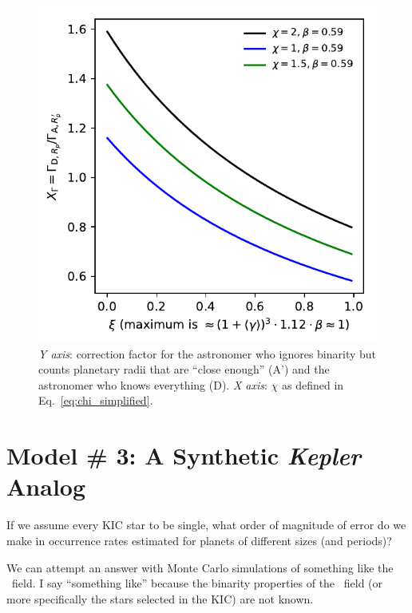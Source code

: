 \documentclass{emulateapj}
\begin{document}
\begin{figure}[!t]
	\begin{center}
		\includegraphics[scale=.8]{figures/XGamma_vs_xi.pdf}
	\end{center}
	\caption{\textit{Y axis}: correction factor for the astronomer who 
	ignores binarity but counts planetary radii that are ``close enough'' (A') 
	and the astronomer who knows everything (D).
	\textit{X axis}: $\chi$ as defined in Eq.~\ref{eq:chi_simplified}.
	}
	\label{fig:XGamma_vs_xi}
\end{figure}



\section{Model \# 3: A Synthetic {\it Kepler} Analog}

If we assume every KIC star to be single, what order of magnitude of error do 
we make in occurrence rates estimated for planets of different sizes (and 
periods)?

We can attempt an answer with Monte Carlo simulations of something like the 
\kepler\ field. I say ``something like'' because the binarity properties of the 
\kepler\ field (or more specifically the stars selected in the KIC) are not 
known.
\end{document}

